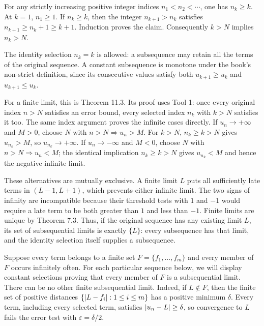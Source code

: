 For any strictly increasing positive integer indices
$n_1<n_2<\cdots$, one has $n_k\geq k$.
At $k=1$, $n_1\geq1$. If $n_k\geq k$, then the integer
$n_{k+1}>n_k$ satisfies
$n_{k+1}\geq n_k+1\geq k+1$. Induction proves the claim.
Consequently $k>N$ implies $n_k>N$.

The identity selection $n_k=k$ is allowed: a subsequence may
retain all the terms of the original sequence. A constant
subsequence is monotone under the book's non-strict definition,
since its consecutive values satisfy both $u_{k+1}\geq u_k$
and $u_{k+1}\leq u_k$.

For a finite limit, this is Theorem 11.3. Its proof uses
Tool 1: once every original index $n>N$ satisfies an error
bound, every selected index $n_k$ with $k>N$ satisfies it too.
The same index argument proves the infinite cases directly.
If $u_n\to+\infty$ and $M>0$, choose $N$ with
$n>N\Longrightarrow u_n>M$. For $k>N$, $n_k\geq k>N$
gives $u_{n_k}>M$, so $u_{n_k}\to+\infty$.
If $u_n\to-\infty$ and $M<0$, choose $N$ with
$n>N\Longrightarrow u_n<M$; the identical implication
$n_k\geq k>N$ gives $u_{n_k}<M$ and hence the negative
infinite limit.

These alternatives are mutually exclusive. A finite limit $L$
puts all sufficiently late terms in $(L-1,L+1)$, which prevents
either infinite limit. The two signs of infinity are incompatible
because their threshold tests with $1$ and $-1$ would require a
late term to be both greater than $1$ and less than $-1$.
Finite limits are unique by Theorem 7.3. Thus, if the original
sequence has any existing limit $L$, its set of subsequential
limits is exactly $\{L\}$: every subsequence has that limit,
and the identity selection itself supplies a subsequence.

Suppose every term belongs to a finite set
$F=\{f_1,\ldots,f_m\}$ and every member of $F$ occurs infinitely
often. For each particular sequence below, we will display
constant selections proving that every member of $F$ is a
subsequential limit.
There can be no other finite subsequential limit. Indeed,
if $L\notin F$, then the finite set of positive distances
$\{\left|L-f_i\right|:1\leq i\leq m\}$ has a positive minimum
$\delta$. Every term, including every selected term,
satisfies $\left|u_n-L\right|\geq\delta$, so convergence to $L$
fails the error test with $\varepsilon=\delta/2$.

